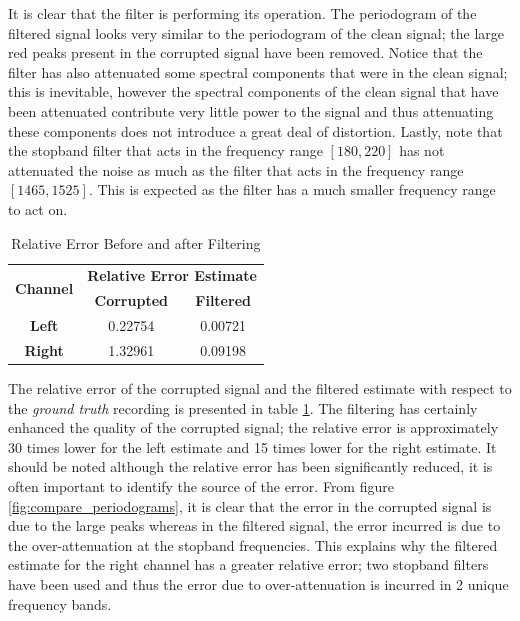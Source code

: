 \documentclass{article}
\begin{document}
It is clear that the filter is performing its operation. The periodogram of the filtered signal looks very similar to the periodogram of the clean signal; the large red peaks present in the corrupted signal have been removed. Notice that the filter has also attenuated some spectral components that were in the clean signal; this is inevitable, however the spectral components of the clean signal that have been attenuated contribute very little power to the signal and thus attenuating these components does not introduce a great deal of distortion. Lastly, note that the stopband filter that acts in the frequency range $[180, 220]$ has not attenuated the noise as much as the filter that acts in the frequency range $[1465, 1525]$. This is expected as the filter has a much smaller frequency range to act on. 
 

\begin{table}[H]
  \centering
    \begin{tabular}{|c|c|c|}
    \hline
    \multirow{2}[4]{*}{\textbf{Channel}} & \multicolumn{2}{c|}{\textbf{Relative Error Estimate}} \\
\cline{2-3}          & \textbf{Corrupted} & \textbf{Filtered} \\
    \hline
    \textbf{Left} & 0.22754 & 0.00721 \\
    \hline
    \textbf{Right} & 1.32961 & 0.09198 \\
    \hline
    \end{tabular}%
  \caption{Relative Error Before and after Filtering}
  \label{tab:relative_error_s2h}%
\end{table}%

The relative error of the corrupted signal and the filtered estimate with respect to the \textit{ground truth} recording is presented in table \ref{tab:relative_error_s2h}. The filtering has certainly enhanced the quality of the corrupted signal; the relative error is approximately 30 times lower for the left estimate and 15 times lower for the right estimate. It should be noted although the relative error has been significantly reduced, it is often important to identify the source of the error. From figure \ref{fig:compare_periodograms}, it is clear that the error in the corrupted signal is due to the large peaks whereas in the filtered signal, the error incurred is due to the over-attenuation at the stopband frequencies. This explains why the filtered estimate for the right channel has a greater relative error; two stopband filters have been used and thus the error due to over-attenuation is incurred in 2 unique frequency bands.\\
\end{document}
